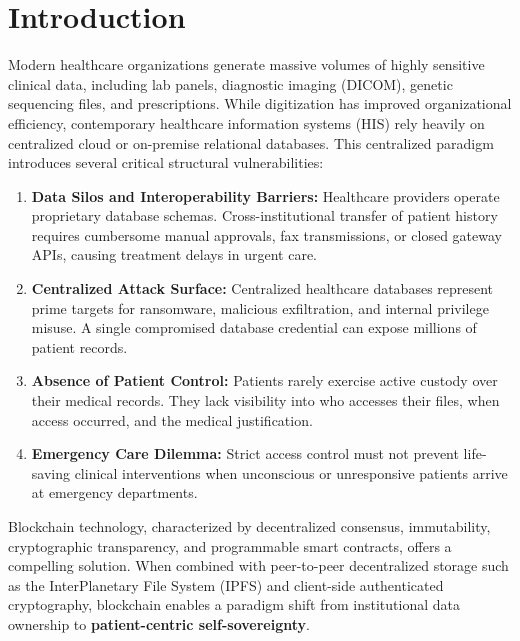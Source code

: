 \documentclass[11pt,a4paper]{article}
\begin{document}
\newpage
\tableofcontents
\newpage

\section{Introduction}
Modern healthcare organizations generate massive volumes of highly sensitive clinical data, including lab panels, diagnostic imaging (DICOM), genetic sequencing files, and prescriptions. While digitization has improved organizational efficiency, contemporary healthcare information systems (HIS) rely heavily on centralized cloud or on-premise relational databases. This centralized paradigm introduces several critical structural vulnerabilities:

\begin{enumerate}[label=(\roman*)]
    \item \textbf{Data Silos and Interoperability Barriers:} Healthcare providers operate proprietary database schemas. Cross-institutional transfer of patient history requires cumbersome manual approvals, fax transmissions, or closed gateway APIs, causing treatment delays in urgent care.
    \item \textbf{Centralized Attack Surface:} Centralized healthcare databases represent prime targets for ransomware, malicious exfiltration, and internal privilege misuse. A single compromised database credential can expose millions of patient records.
    \item \textbf{Absence of Patient Control:} Patients rarely exercise active custody over their medical records. They lack visibility into who accesses their files, when access occurred, and the medical justification.
    \item \textbf{Emergency Care Dilemma:} Strict access control must not prevent life-saving clinical interventions when unconscious or unresponsive patients arrive at emergency departments.
\end{enumerate}

Blockchain technology, characterized by decentralized consensus, immutability, cryptographic transparency, and programmable smart contracts, offers a compelling solution. When combined with peer-to-peer decentralized storage such as the InterPlanetary File System (IPFS) and client-side authenticated cryptography, blockchain enables a paradigm shift from institutional data ownership to \textbf{patient-centric self-sovereignty}.
\end{document}
